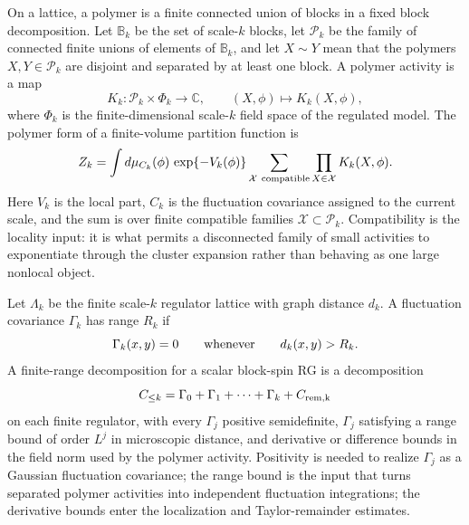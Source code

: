 On a lattice, a polymer is a finite connected union of blocks in a fixed block
decomposition.  Let \(\mathbb B_k\) be the set of scale-\(k\) blocks, let
\(\mathcal P_k\) be the family of connected finite unions of elements of
\(\mathbb B_k\), and let \(X\sim Y\) mean that the polymers \(X,Y\in
\mathcal P_k\) are disjoint and separated by at least one block.  A polymer
activity is a map
\[
  K_k:\mathcal P_k\times\Phi_k\to\mathbb C,\qquad
  (X,\phi)\mapsto K_k(X,\phi),
\]
where \(\Phi_k\) is the finite-dimensional scale-\(k\) field space of the
regulated model.  The polymer form of a finite-volume partition function is
\begin{equation}
  Z_k
  =
  \int d\mu_{C_k}(\phi)\,\exp\{-V_k(\phi)\}
  \sum_{\mathcal X\ {\rm compatible}}
  \prod_{X\in\mathcal X}K_k(X,\phi).
  \label{eq:polymer-partition-function-rg}
\end{equation}
Here \(V_k\) is the local part, \(C_k\) is the fluctuation covariance assigned
to the current scale, and the sum is over finite compatible families
\(\mathcal X\subset\mathcal P_k\).  Compatibility is the locality input: it
is what permits a disconnected family of small activities to exponentiate
through the cluster expansion rather than behaving as one large nonlocal
object.

\begin{definition}
\label{def:finite-range-fluctuation-covariance-datum}
Let \(\Lambda_k\) be the finite scale-\(k\) regulator lattice with graph
distance \(d_k\).  A fluctuation covariance \(\Gamma_k\) has range
\(R_k\) if
\begin{equation}
  \Gamma_k(x,y)=0
  \qquad{\rm whenever}\qquad d_k(x,y)>R_k .
  \label{eq:finite-range-covariance-support}
\end{equation}
A finite-range decomposition for a scalar block-spin RG is a decomposition
\[
  C_{\leq k}=\Gamma_0+\Gamma_1+\cdots+\Gamma_k+C_{\rm rem,k}
\]
on each finite regulator, with every \(\Gamma_j\) positive semidefinite,
\(\Gamma_j\) satisfying a range bound of order \(L^j\) in microscopic
distance, and derivative or difference bounds in the field norm used by the
polymer activity.  Positivity is needed to realize \(\Gamma_j\) as a Gaussian
fluctuation covariance; the range bound is the input that turns separated
polymer activities into independent fluctuation integrations; the derivative
bounds enter the localization and Taylor-remainder estimates.
\end{definition}

